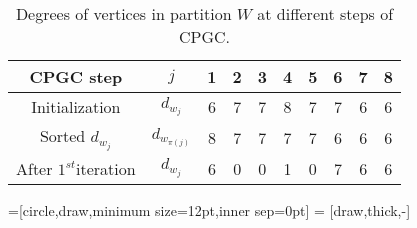 \begin{table}[h!]
\centering
{\scriptsize
 \begin{tabular}{c c c c c c c c c c} 
 \hline
 \textsf{CPGC} step & $j$ & 1 & 2 & 3 & 4 & 5 & 6 & 7 & 8\\ %
  \hline
 Initialization & $d_{w_j}$ & 6 &  7 & 7 & 8 & 7 & 7 & 6 & 6\\ %
 Sorted $d_{w_j}$ & $d_{w_{\pi(j)}} $ & 8 &  7 & 7 & 7 & 7 & 6 & 6 & 6\\ %
After $1^{st}$iteration &  $d_{w_j}$ & 6 &  0 & 0 & 1 & 0 & 7 & 6 & 6\\ %
 \hline
\end{tabular}
\vspace*{0.15cm}
\caption{Degrees of vertices in partition $W$ at different steps of \textsf{CPGC}.}
\label{table:1}
}
\vspace*{-0.3cm}
\end{table}





=[circle,draw,minimum size=12pt,inner sep=0pt]
 = [draw,thick,-]
\usetikzlibrary{decorations.markings}
\usetikzlibrary{shapes,decorations,arrows,calc,arrows.meta,fit,positioning}


